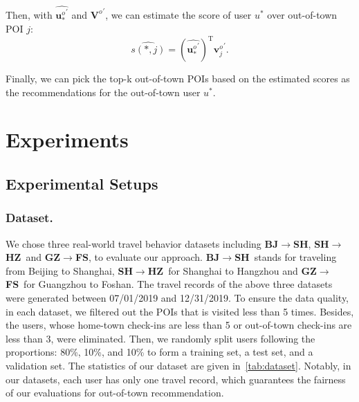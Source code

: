 \documentclass[letterpaper]{article} %
\newcommand{\bjsh}{{\bf BJ\ensuremath{\rightarrow}SH}}
\newcommand{\shhz}{{\bf SH\ensuremath{\rightarrow}HZ}}
\newcommand{\gzfs}{{\bf GZ\ensuremath{\rightarrow}FS}}
\begin{document}
Then, with $\widehat{{\mathbf{u}^o_{\ast}}^{\prime}}$ and ${\mathbf{V}^o}^{\prime}$, we can estimate the score of user $u^{\ast}$ over out-of-town POI $j$:
\begin{equation} \label{e:rec_score}
    \widehat{s({\ast},j)} =
    \left(\widehat{{\mathbf{u}^o_{\ast}}^{\prime}}\right)^\mathrm{T}
    {\mathbf{v}^o_j}^{\prime} .
\end{equation}

Finally, we can pick the top-k out-of-town POIs based on the estimated scores as the recommendations for the out-of-town user $u^{\ast}$.



\section{Experiments}

\subsection{Experimental Setups}

\subsubsection{Dataset.}
We chose three real-world travel behavior datasets including \bjsh, \shhz ~and \gzfs, to evaluate our approach.
\bjsh ~stands for traveling from Beijing to Shanghai, \shhz ~for Shanghai to Hangzhou and \gzfs ~for Guangzhou to Foshan.
The travel records of the above three datasets were generated between 07/01/2019 and 12/31/2019.
To ensure the data quality, in each dataset, we filtered out the POIs that is visited less than 5 times.
Besides, the users, whose home-town check-ins are less than 5 or out-of-town check-ins are less than 3, were eliminated.
Then, we randomly split users following the proportions: 80\%, 10\%, and 10\% to form a training set, a test set, and a validation set.
The statistics of our dataset are given in~\cref{tab:dataset}.
Notably, in our datasets, each user has only one travel record, which guarantees the fairness of our evaluations for out-of-town recommendation. %
\end{document}
